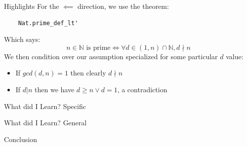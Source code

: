 \documentclass[presentation]{beamer}
\begin{document}
\begin{frame}[fragile]{Highlights}
    For the \(\impliedby\) direction, we use the theorem:
    \begin{verbatim}
    Nat.prime_def_lt'
    \end{verbatim}
    Which says:
    \[n \in \mathbb{N} \text{ is prime} \iff \forall d \in (1, n) \cap \mathbb{N}, d \nmid n\]
    \pause
    We then condition over our assumption specialized for some particular \(d\) value:
    \begin{itemize}
        \item If \(gcd(d, n) = 1\) then clearly \(d \nmid n\)
        \item If \(d \vert n\) then we have \(d \geq n \vee d = 1\), a contradiction
    \end{itemize}
    
\end{frame}


\begin{frame}{What did I Learn?}
    Specific
\end{frame}

\begin{frame}{What did I Learn?}
    General
\end{frame}


\begin{frame}{Conclusion}
    
\end{frame}
\end{document}
